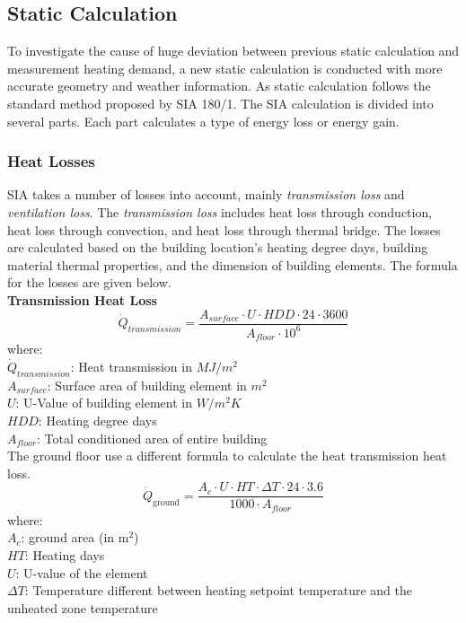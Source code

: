 \documentclass[11pt, a4paper]{article}
\theoremstyle{definition}
\begin{document}
	\subsection{Static Calculation}
		To investigate the cause of huge deviation between previous static calculation and measurement heating demand, a new static calculation is conducted with more accurate geometry and weather information. As static calculation follows the standard method proposed by SIA 180/1. The SIA calculation is divided into several parts. Each part calculates a type of energy loss or energy gain. 

		\subsubsection{Heat Losses}
			SIA takes a number of losses into account, mainly \textit{transmission loss} and \textit{ventilation loss}. The \textit{transmission loss} includes heat loss through conduction, heat loss through convection, and heat loss through thermal bridge. The losses are calculated based on the building location's heating degree days, building material thermal properties, and the dimension of building elements. The formula for the losses are given below.\\

			\textbf{Transmission Heat Loss}\\

				\[\dot{Q}_{transmission} =\frac{ A_{surface} \cdot U \cdot HDD \cdot 24 \cdot 3600}{A_{floor} \cdot 10^6}\]
				where:\\
				$\dot{Q}_{transmission}$: Heat transmission in $MJ/m^2$\\
				$A_{surface}$: Surface area of building element in $m^2$\\
				$U$: U-Value of building element in $ W/m^2K$\\
				$HDD$: Heating degree days\\
				$A_{floor}$: Total conditioned area of entire building\\

				The ground floor use a different formula to calculate the heat transmission heat loss.
				\[\dot{Q}_{\text{ground}} = \frac{ A_{c} \cdot U \cdot HT \cdot \Delta T \cdot 24 \cdot 3.6}{1000 \cdot A_{floor}}\]
				where:\\
				$A_c$: ground area (in m$^2$)\\
				$HT$: Heating days\\
				$U$: U-value of the element\\
				$\Delta T$: Temperature different between heating setpoint temperature and the unheated zone temperature\\
\end{document}
